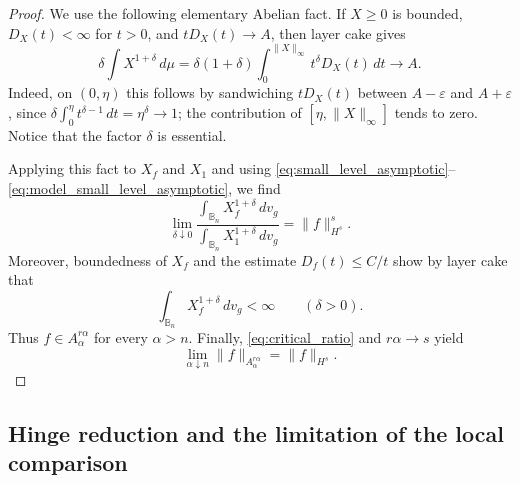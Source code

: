 \documentclass[11pt]{amsart}
\theoremstyle{plain}
\theoremstyle{definition}
\theoremstyle{remark}
\newcommand{\B}{\mathbb{B}}
\begin{document}
\begin{proof}
We use the following elementary Abelian fact.  If $X\ge0$ is bounded,
$D_X(t)<\infty$ for $t>0$, and $tD_X(t)\to A$, then layer cake gives
\[
\delta\int X^{1+\delta}\,d\mu
=\delta(1+\delta)\int_0^{\|X\|_\infty}t^\delta D_X(t)\,dt
\longrightarrow A.
\]
Indeed, on $(0,\eta)$ this follows by sandwiching $tD_X(t)$ between
$A-\varepsilon$ and $A+\varepsilon$, since
$\delta\int_0^\eta t^{\delta-1}\,dt=\eta^\delta\to1$; the contribution of
$[\eta,\|X\|_\infty]$ tends to zero.  Notice that the factor $\delta$ is
essential.

Applying this fact to $X_f$ and $X_1$ and using
\eqref{eq:small_level_asymptotic}--\eqref{eq:model_small_level_asymptotic}, we find
\[
\lim_{\delta\downarrow0}
\frac{\int_{\B_n}X_f^{1+\delta}\,dv_g}
{\int_{\B_n}X_1^{1+\delta}\,dv_g}
=\|f\|_{H^s}^s.
\]
Moreover, boundedness of $X_f$ and the estimate $D_f(t)\le C/t$ show by layer
cake that
\[
\int_{\B_n} X_f^{1+\delta}\,dv_g<\infty
\qquad(\delta>0).
\]
Thus
$f\in A_\alpha^{r\alpha}$ for every $\alpha>n$.  Finally,
\eqref{eq:critical_ratio} and $r\alpha\to s$ yield
\[
\lim_{\alpha\downarrow n}\|f\|_{A_\alpha^{r\alpha}}
=\|f\|_{H^s}.
\]
\end{proof}


\subsection{Hinge reduction and the limitation of the local comparison}\label{sec:hinge_limitation}
\end{document}
